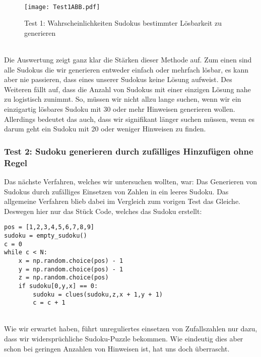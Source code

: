 \documentclass[11pt,a4paper]{article}
\begin{document}
\ \\
\begin{figure}[htbp!]
\begin{center}
\texttt{[image: Test1ABB.pdf]}
\end{center}
\caption{Test 1: Wahrscheinlichkeiten Sudokus bestimmter Lösbarkeit zu generieren}
\end{figure}
\ \\ 
Die Auswertung zeigt ganz klar die Stärken dieser Methode auf. Zum einen sind alle Sudokus die wir generieren entweder einfach oder mehrfach lösbar, es kann aber nie passieren, dass eines unserer Sudokus keine Lösung aufweist. Des Weiteren fällt auf, dass die Anzahl von Sudokus mit einer einzigen Lösung nahe zu logistisch zunimmt. So, müssen wir nicht allzu lange suchen, wenn wir ein einzigartig lösbares Sudoku mit 30 oder mehr Hinweisen generieren wollen.
Allerdings bedeutet das auch, dass wir signifikant länger suchen müssen, wenn es darum geht ein Sudoku mit 20 oder weniger Hinweisen zu finden.

\newpage
\subsubsection{Test 2: Sudoku generieren durch zufälliges Hinzufügen ohne Regel}
Das nächste Verfahren, welches wir untersuchen wollten, war: Das Generieren von Sudokus durch zufälliges Einsetzen von Zahlen in ein leeres Sudoku. Das allgemeine Verfahren blieb dabei im Vergleich zum vorigen Test das Gleiche. Deswegen hier nur das Stück Code, welches das Sudoku erstellt:
\ \\
\begin{verbatim}                     
pos = [1,2,3,4,5,6,7,8,9]             
sudoku = empty_sudoku()       
c = 0                         
while c < N:                                     
    x = np.random.choice(pos) - 1                
    y = np.random.choice(pos) - 1                
    z = np.random.choice(pos)                    
    if sudoku[0,y,x] == 0:                       
        sudoku = clues(sudoku,z,x + 1,y + 1)     
        c = c + 1                                 
\end{verbatim}
\ \\

Wie wir erwartet haben, führt unreguliertes einsetzen von Zufallszahlen nur dazu, dass wir widersprüchliche Sudoku-Puzzle bekommen. Wie eindeutig dies aber schon bei geringen Anzahlen von Hinweisen ist, hat uns doch überrascht. 
\end{document}
